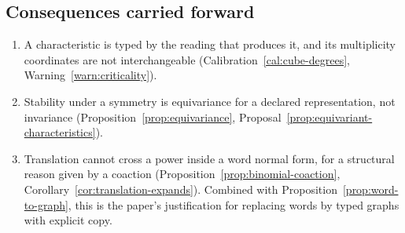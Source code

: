 \subsection{Consequences carried forward}

\begin{enumerate}
\item A characteristic is typed by the reading that produces it, and its multiplicity
  coordinates are not interchangeable
  (Calibration~\ref{cal:cube-degrees}, Warning~\ref{warn:criticality}).
\item Stability under a symmetry is equivariance for a declared representation, not
  invariance (Proposition~\ref{prop:equivariance},
  Proposal~\ref{prop:equivariant-characteristics}).
\item Translation cannot cross a power inside a word normal form, for a structural
  reason given by a coaction (Proposition~\ref{prop:binomial-coaction},
  Corollary~\ref{cor:translation-expands}).  Combined with
  Proposition~\ref{prop:word-to-graph}, this is the paper's justification for replacing
  words by typed graphs with explicit copy.
\end{enumerate}
